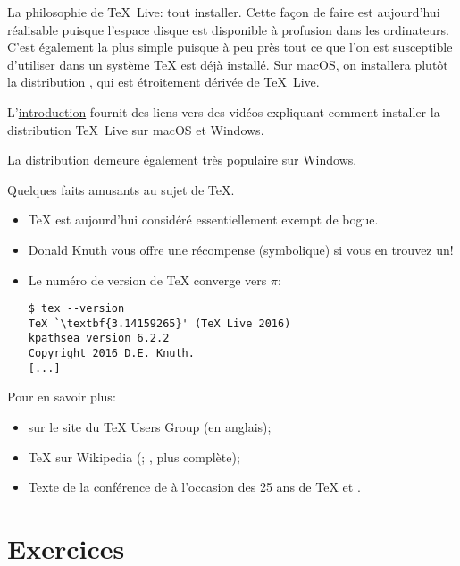 La philosophie de {\TeX}~Live: tout installer. Cette façon de faire
est aujourd'hui réalisable puisque l'espace disque est disponible à
profusion dans les ordinateurs. C'est également la plus simple puisque
à peu près tout ce que l'on est susceptible d'utiliser dans un système
{\TeX} est déjà installé. Sur macOS, on installera plutôt la
distribution %
, %
qui est étroitement dérivée de {\TeX}~Live.

L'\hyperref[chap:introduction]{introduction} fournit des liens vers
des vidéos expliquant comment installer la distribution {\TeX}~Live
sur macOS et Windows.

La distribution %
demeure également très populaire sur Windows.

\begin{information}
  Quelques faits amusants au sujet de {\TeX}.
  \begin{itemize}
  \item {\TeX} est aujourd'hui considéré essentiellement exempt de
    bogue.
  \item Donald Knuth vous offre une récompense (symbolique) si vous en
    trouvez un!
  \item Le numéro de version de {\TeX} converge vers $\pi$:
\begin{lstlisting}
$ tex --version
TeX `\textbf{3.14159265}' (TeX Live 2016)
kpathsea version 6.2.2
Copyright 2016 D.E. Knuth.
[...]
\end{lstlisting} %
  \end{itemize}
  Pour en savoir plus:
  \begin{itemize}
  \item {} sur le
    site du {\TeX} Users Group (en anglais);
  \item {\TeX} sur Wikipedia
    (;
    , plus
    complète);
  \item Texte de la conférence de \citet{Beebe:keynote:2004} à
    l'occasion des 25 ans de {\TeX} et .
  \end{itemize}
\end{information}



\section{Exercices}
\label{sec:presentation:exercices}

